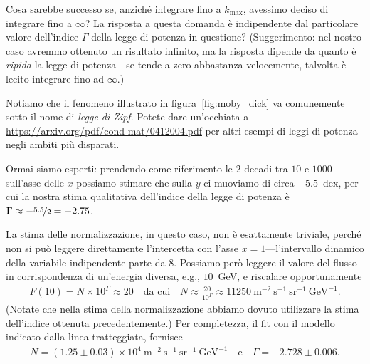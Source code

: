 Cosa sarebbe successo se, anziché integrare fino a $k_{\text{max}}$, avessimo
deciso di integrare fino a $\infty$? La risposta a questa domanda è
indipendente dal particolare valore dell'indice $\Gamma$ della legge di
potenza in questione? (Suggerimento: nel nostro caso avremmo ottenuto un
risultato infinito, ma la risposta dipende da quanto è \emph{ripida} la legge
di potenza---se tende a zero abbastanza velocemente, talvolta è lecito
integrare fino ad $\infty$.)

Notiamo che il fenomeno illustrato in figura~\ref{fig:moby_dick} va comunemente
sotto il nome di \emph{legge di Zipf}. Potete dare un'occhiata a
\url{https://arxiv.org/pdf/cond-mat/0412004.pdf} per altri esempi di leggi di
potenza negli ambiti più disparati.



Ormai siamo esperti: prendendo come riferimento le $2$ decadi tra $10$ e $1000$
sull'asse delle $x$ possiamo stimare che sulla $y$ ci muoviamo di circa $-5.5$~dex,
per cui la nostra stima qualitativa dell'indice della legge di potenza è
$\Gamma \approx -\nicefrac{5.5}{2} = -2.75$.

La stima delle normalizzazione, in questo caso, non è esattamente triviale,
perché non si può leggere direttamente l'intercetta con l'asse $x=1$---l'intervallo
dinamico della variabile indipendente parte da $8$. Possiamo però leggere
il valore del flusso in corrispondenza di un'energia diversa, e.g., $10$~GeV,
e riscalare opportunamente
\begin{align*}
  F(10) = N \times 10^\Gamma \approx 20 \quad \text{da cui} \quad
  N \approx \frac{20}{10^\Gamma} \approx
  11250~\text{m}^{-2}~\text{s}^{-1}~\text{sr}^{-1}~\text{GeV}^{-1}.
\end{align*}
(Notate che nella stima della normalizzazione abbiamo dovuto utilizzare la stima
dell'indice ottenuta precedentemente.) Per completezza, il fit con il modello
indicato dalla linea tratteggiata, fornisce
\begin{align*}
  N = (1.25 \pm 0.03) \times 10^4~\text{m}^{-2}~\text{s}^{-1}~\text{sr}^{-1}~\text{GeV}^{-1}
  \quad \text{e} \quad \Gamma = -2.728 \pm 0.006.
\end{align*}

